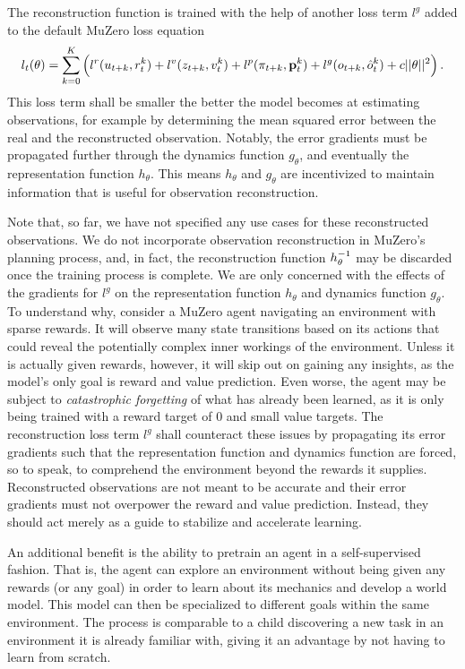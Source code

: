 The reconstruction function is trained with the help of another loss term $l^g$ added to the default MuZero loss equation
\begin{equation*}
    l_t(\theta) = \sum^K_{k=0} \left(l^r(u_{t+k}, r_t^k) + l^v(z_{t+k}, v_t^k) + l^p(\pi_{t+k}, \text{\textbf{p}}_t^k) + l^g(o_{t+k}, \hat{o}^k_t) + c||\theta||^2\right).
\end{equation*}
This loss term shall be smaller the better the model becomes at estimating observations, for example by determining the mean squared error between the real and the reconstructed observation. Notably, the error gradients must be propagated further through the dynamics function $g_\theta$, and eventually the representation function $h_\theta$. This means $h_\theta$ and $g_\theta$ are incentivized to maintain information that is useful for observation reconstruction.

Note that, so far, we have not specified any use cases for these reconstructed observations. We do not incorporate observation reconstruction in MuZero's planning process, and, in fact, the reconstruction function $h^{-1}_\theta$ may be discarded once the training process is complete. We are only concerned with the effects of the gradients for $l^g$ on the representation function $h_\theta$ and dynamics function $g_\theta$. To understand why, consider a MuZero agent navigating an environment with sparse rewards. It will observe many state transitions based on its actions that could reveal the potentially complex inner workings of the environment. Unless it is actually given rewards, however, it will skip out on gaining any insights, as the model's only goal is reward and value prediction. Even worse, the agent may be subject to \textit{catastrophic forgetting} of what has already been learned, as it is only being trained with a reward target of $0$ and small value targets. The reconstruction loss term $l^g$ shall counteract these issues by propagating its error gradients such that the representation function and dynamics function are forced, so to speak, to comprehend the environment beyond the rewards it supplies. Reconstructed observations are not meant to be accurate and their error gradients must not overpower the reward and value prediction. Instead, they should act merely as a guide to stabilize and accelerate learning.

An additional benefit is the ability to pretrain an agent in a self-supervised fashion. That is, the agent can explore an environment without being given any rewards (or any goal) in order to learn about its mechanics and develop a world model. This model can then be specialized to different goals within the same environment. The process is comparable to a child discovering a new task in an environment it is already familiar with, giving it an advantage by not having to learn from scratch.
